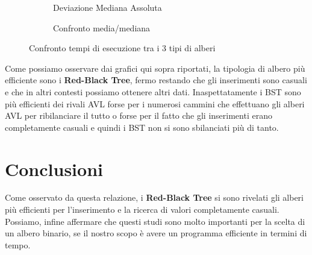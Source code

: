 \documentclass[a4paper,titlepage]{article}
\begin{document}
\begin{figure}[h]
  \centering
  \begin{subfigure}{\textwidth}
    \captionsetup{justification=centering}
     \caption{Deviazione Mediana Assoluta}
     \label{fig:bst_avl_rbt_median}
  \end{subfigure}%
  \vspace{2pt}
  \begin{subfigure}{\textwidth}
    \captionsetup{justification=centering}
    \caption{Confronto media/mediana}
     \label{fig:bst_avl_rbt_mean}
  \end{subfigure}
  \caption{Confronto tempi di esecuzione tra i 3 tipi di alberi}
\end{figure}

Come possiamo osservare dai grafici qui sopra riportati, la tipologia di albero più efficiente sono i \textbf{Red-Black Tree}, fermo restando che gli inserimenti sono casuali e che in altri contesti possiamo ottenere altri dati. Inaspettatamente i BST sono più efficienti dei rivali AVL forse per i numerosi cammini che effettuano gli alberi AVL per ribilanciare il tutto o forse per il fatto che gli inserimenti erano completamente casuali e quindi i BST non si sono sbilanciati più di tanto.
\newpage

\section{Conclusioni}

Come osservato da questa relazione, i \textbf{Red-Black Tree} si sono rivelati gli alberi più efficienti per l’inserimento e la ricerca di valori completamente casuali. Possiamo, infine affermare che questi studi sono molto importanti per la scelta di un albero binario, se il nostro scopo è avere un programma efficiente in termini di tempo.
\end{document}
